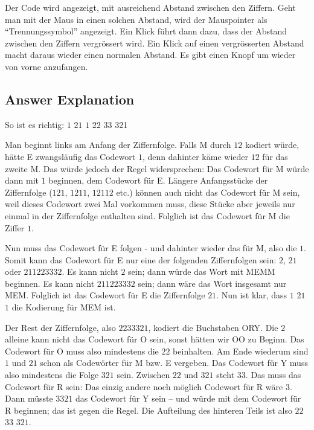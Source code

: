 \documentclass[a4paper,11pt]{report}
\newcommand{\BrochureInlineCode}[1]{{\ttfamily #1}}
\begin{document}
Der Code wird angezeigt, mit ausreichend Abstand zwischen den Ziffern.  Geht man mit der Maus in einen solchen Abstand, wird der Mauspointer als \enquote{Trennungssymbol} angezeigt.  Ein Klick führt dann dazu, dass der Abstand zwischen den Ziffern vergrössert wird.  Ein Klick auf einen vergrösserten Abstand macht daraus wieder einen normalen Abstand. Es gibt einen Knopf um wieder von vorne anzufangen.

\endgroup

\subsection*{Answer Explanation}

So ist es richtig: $1$ $21$ $1$ $22$ $33$ 321

Man beginnt links am Anfang der Ziffernfolge. Falls \BrochureInlineCode{M} durch $12$ kodiert würde, hätte \BrochureInlineCode{E} zwangsläufig das Codewort $1$, denn dahinter käme wieder $12$ für das zweite \BrochureInlineCode{M}. Das würde jedoch der Regel widersprechen: Das Codewort für \BrochureInlineCode{M} würde dann mit $1$ beginnen, dem Codewort für E. Längere Anfangsstücke der Ziffernfolge ($121$, $1211$, $12112$ etc.) können auch nicht das Codewort für \BrochureInlineCode{M} sein, weil dieses Codewort zwei Mal vorkommen muss, diese Stücke aber jeweils nur einmal in der Ziffernfolge enthalten sind. Folglich ist das Codewort für \BrochureInlineCode{M} die Ziffer $1$.

Nun muss das Codewort für \BrochureInlineCode{E} folgen - und dahinter wieder das für M, also die $1$.  Somit kann das Codewort für \BrochureInlineCode{E} nur eine der folgenden Ziffernfolgen sein: $2$, $21$ oder $211223332$. Es kann nicht $2$ sein; dann würde das Wort mit MEMM beginnen. Es kann nicht $211223332$ sein; dann wäre das Wort insgesamt nur MEM. Folglich ist das Codewort für \BrochureInlineCode{E} die Ziffernfolge $21$. Nun ist klar, dass $1$ $21$ $1$ die Kodierung für MEM ist.

Der Rest der Ziffernfolge, also $2233321$, kodiert die Buchstaben ORY. Die $2$ alleine kann nicht das Codewort für \BrochureInlineCode{O} sein, sonst hätten wir \BrochureInlineCode{OO} zu Beginn. Das Codewort für \BrochureInlineCode{O} muss also mindestens die $22$ beinhalten. Am Ende wiederum sind $1$ und $21$ schon als Codewörter für \BrochureInlineCode{M} bzw. \BrochureInlineCode{E} vergeben. Das Codewort für \BrochureInlineCode{Y} muss also mindestens die Folge $321$ sein. Zwischen $22$ und $321$ steht $33$. Das muss das Codewort für \BrochureInlineCode{R} sein: Das einzig andere noch möglich Codewort für \BrochureInlineCode{R} wäre $3$. Dann müsste $3321$ das Codewort für \BrochureInlineCode{Y} sein – und würde mit dem Codewort für \BrochureInlineCode{R} beginnen; das ist gegen die Regel. Die Aufteilung des hinteren Teils ist also $22$ $33$ $321$.
\end{document}

